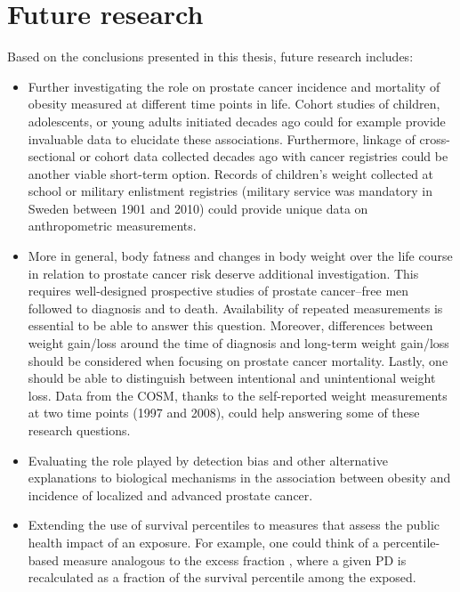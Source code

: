 %

\chapter{Future research}

Based on the conclusions presented in this thesis, future research includes: 

\begin{itemize}
\item Further investigating the role on prostate cancer incidence and mortality of obesity measured at different time points in life. Cohort studies of children, adolescents, or young adults initiated decades ago could for example provide invaluable data to elucidate these associations. Furthermore, linkage of cross-sectional or cohort data collected decades ago with cancer registries could be another viable short-term option. Records of children's weight collected at school or military enlistment registries (military service was mandatory in Sweden between 1901 and 2010) could provide unique data on anthropometric measurements.

\item More in general, body fatness and changes in body weight over the life course in relation to prostate cancer risk deserve additional investigation. This requires well-designed prospective studies of prostate cancer--free men followed to diagnosis and to death. Availability of repeated measurements is essential to be able to answer this question. Moreover, differences between weight gain/loss around the time of diagnosis and long-term weight gain/loss should be considered when focusing on prostate cancer mortality. Lastly, one should be able to distinguish between intentional and unintentional weight loss. Data from the COSM, thanks to the self-reported weight measurements at two time points (1997 and 2008),  could help answering some of these research questions.

\item Evaluating the role played by detection bias and other alternative explanations to biological mechanisms in the association between obesity and incidence of localized and advanced prostate cancer. 

\item Extending the use of survival percentiles to measures that assess the public health impact of an exposure. For example, one could think of a percentile-based measure analogous to the excess fraction \citep{greenland_measures_2008}, where a given PD is recalculated as a fraction of the survival percentile among the exposed. %


\end{itemize}
